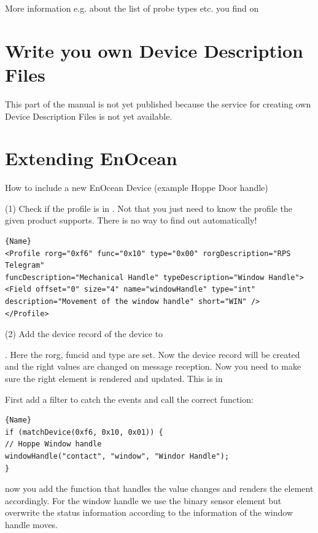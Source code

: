 More information e.g. about the list of probe types etc. you find on 


\section{Write you own Device Description Files}
\label {newddr} 

This part of the manual is not yet published because the service for creating own Device 
Description Files is not yet available.

\section{Extending EnOcean}
\label{addenocean}

How to include a new EnOcean Device (example Hoppe Door handle)

(1) Check if the profile is in . Not that 
you just need to know the profile the given product supports. There is no way 
to find out automatically! 

\begin{lstlisting}[caption=EnOcean Profile Entry,basicstyle=\small,columns=fullflexible]{Name}
<Profile rorg="0xf6" func="0x10" type="0x00" rorgDescription="RPS Telegram" 
funcDescription="Mechanical Handle" typeDescription="Window Handle">
<Field offset="0" size="4" name="windowHandle" type="int" 
description="Movement of the window handle" short="WIN" />
</Profile>
\end{lstlisting}

(2) Add the device record of the device to 

{\small
{}. 
}
Here the rorg, funcid and type are set. Now the device record will be created and the 
right values are changed on message reception. Now you need to make sure the right  
element is rendered and updated. This is 
in 

First add a filter to catch the events and call the correct function:

\begin{lstlisting}[caption=Catch Device IDs,basicstyle=\small,columns=fullflexible]{Name}
if (matchDevice(0xf6, 0x10, 0x01)) {
// Hoppe Window handle
windowHandle("contact", "window", "Windor Handle"); 
}
\end{lstlisting}
now you add the function that handles the value changes and renders the element 
accordingly. For the window handle we use the binary sensor element but overwrite 
the status information according to the information of the window handle moves.  

